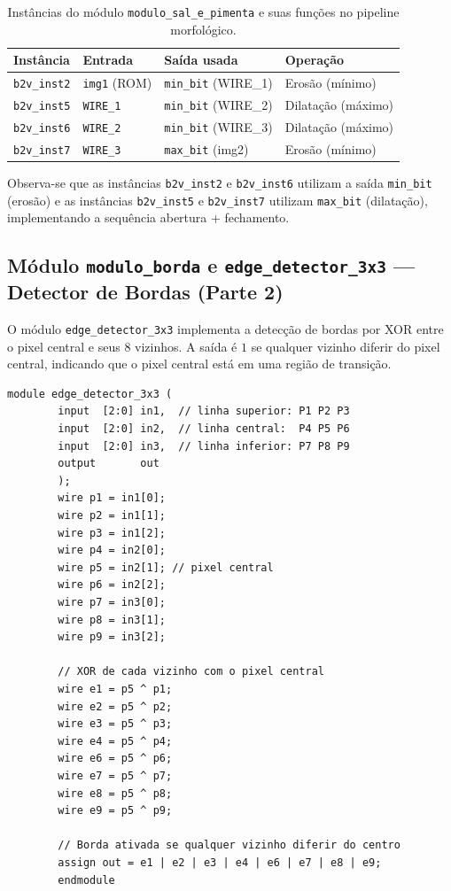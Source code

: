 \documentclass[12pt, a4paper]{article}
\begin{document}
	\begin{table}[H]
		\centering
		\caption{Instâncias do módulo \texttt{modulo\_sal\_e\_pimenta} e suas
			funções no pipeline morfológico.}
		\label{tab:instancias}
		\begin{tabular}{llll}
			\toprule
			\textbf{Instância} & \textbf{Entrada}              & \textbf{Saída usada}          & \textbf{Operação} \\
			\midrule
			\texttt{b2v\_inst2} & \texttt{img1} (ROM)          & \texttt{min\_bit} (WIRE\_1)   & Erosão (mínimo)   \\
			\texttt{b2v\_inst5} & \texttt{WIRE\_1}             & \texttt{min\_bit} (WIRE\_2)   & Dilatação (máximo)\\
			\texttt{b2v\_inst6} & \texttt{WIRE\_2}             & \texttt{min\_bit} (WIRE\_3)   & Dilatação (máximo)\\
			\texttt{b2v\_inst7} & \texttt{WIRE\_3}             & \texttt{max\_bit} (img2)      & Erosão (mínimo)   \\
			\bottomrule
		\end{tabular}
	\end{table}
	
	\noindent Observa-se que as instâncias \texttt{b2v\_inst2} e \texttt{b2v\_inst6}
	utilizam a saída \texttt{min\_bit} (erosão) e as instâncias \texttt{b2v\_inst5}
	e \texttt{b2v\_inst7} utilizam \texttt{max\_bit} (dilatação), implementando a
	sequência abertura + fechamento.
	
	\subsection{Módulo \texttt{modulo\_borda} e \texttt{edge\_detector\_3x3} --- Detector de Bordas (Parte 2)}
	
	O módulo \texttt{edge\_detector\_3x3} implementa a detecção de bordas por XOR
	entre o pixel central e seus 8 vizinhos. A saída é $1$ se qualquer vizinho
	diferir do pixel central, indicando que o pixel central está em uma região de
	transição.
	
	\begin{lstlisting}[style=verilog, caption={\texttt{edge\_detector\_3x3.v} --- Detector de bordas combinacional por XOR com o pixel central.}, label={lst:edge}]
		module edge_detector_3x3 (
		input  [2:0] in1,  // linha superior: P1 P2 P3
		input  [2:0] in2,  // linha central:  P4 P5 P6
		input  [2:0] in3,  // linha inferior: P7 P8 P9
		output       out
		);
		wire p1 = in1[0];
		wire p2 = in1[1];
		wire p3 = in1[2];
		wire p4 = in2[0];
		wire p5 = in2[1]; // pixel central
		wire p6 = in2[2];
		wire p7 = in3[0];
		wire p8 = in3[1];
		wire p9 = in3[2];
		
		// XOR de cada vizinho com o pixel central
		wire e1 = p5 ^ p1;
		wire e2 = p5 ^ p2;
		wire e3 = p5 ^ p3;
		wire e4 = p5 ^ p4;
		wire e6 = p5 ^ p6;
		wire e7 = p5 ^ p7;
		wire e8 = p5 ^ p8;
		wire e9 = p5 ^ p9;
		
		// Borda ativada se qualquer vizinho diferir do centro
		assign out = e1 | e2 | e3 | e4 | e6 | e7 | e8 | e9;
		endmodule
	\end{lstlisting}
	
\end{document}
